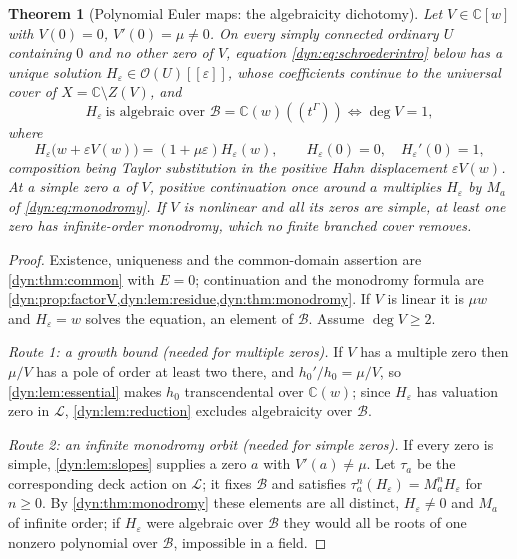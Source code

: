 \documentclass[11pt,letterpaper]{article}
\newtheorem{theorem}{Theorem}[section]
\theoremstyle{definition}
\theoremstyle{remark}
\newcommand{\C}{\mathbb C}
\newcommand{\OO}{\mathcal O}
\newcommand{\BB}{\mathscr B}
\newcommand{\LL}{\mathscr L}
\newcommand{\eps}{\varepsilon}
\numberwithin{equation}{section}
\begin{document}
\begin{theorem}[Polynomial Euler maps: the algebraicity dichotomy]
\label{dyn:thm:dichotomy}
Let $V\in\C[w]$ with $V(0)=0$, $V'(0)=\mu\ne0$. On every simply connected
ordinary $U$ containing $0$ and no other zero of $V$, equation
\eqref{dyn:eq:schroederintro} below has a unique solution
$H_\eps\in\OO(U)[[\eps]]$, whose coefficients continue to the universal
cover of $X=\C\setminus Z(V)$, and
\begin{equation}\label{dyn:eq:dichotomy}
 H_\eps\ \text{is algebraic over }\BB=\C(w)((t^{\Gamma}))
 \iff \deg V=1 ,
\end{equation}
where
\begin{equation}\label{dyn:eq:schroederintro}
 H_\eps\bigl(w+\eps V(w)\bigr)=(1+\mu\eps)H_\eps(w),
 \qquad H_\eps(0)=0,\quad H_\eps'(0)=1,
\end{equation}
composition being Taylor substitution in the positive Hahn displacement
$\eps V(w)$. At a simple zero $a$ of $V$, positive continuation once around
$a$ multiplies $H_\eps$ by $M_a$ of \eqref{dyn:eq:monodromy}. If $V$ is
nonlinear and all its zeros are simple, at least one zero has
infinite-order monodromy, which no finite branched cover removes.
\end{theorem}
\begin{proof}
Existence, uniqueness and the common-domain assertion are
\cref{dyn:thm:common} with $E=0$; continuation and the monodromy formula
are \cref{dyn:prop:factorV,dyn:lem:residue,dyn:thm:monodromy}. If $V$ is
linear it is $\mu w$ and $H_\eps=w$ solves the equation, an element of
$\BB$. Assume $\deg V\ge2$.

\emph{Route 1: a growth bound (needed for multiple zeros).} If $V$ has a
multiple zero then $\mu/V$ has a pole of order at least two there, and
$h_0'/h_0=\mu/V$, so \cref{dyn:lem:essential} makes $h_0$ transcendental
over $\C(w)$; since $H_\eps$ has valuation zero in $\LL$,
\cref{dyn:lem:reduction} excludes algebraicity over $\BB$.

\emph{Route 2: an infinite monodromy orbit (needed for simple zeros).} If
every zero is simple, \cref{dyn:lem:slopes} supplies a zero $a$ with
$V'(a)\ne\mu$. Let $\tau_a$ be the corresponding deck action on $\LL$; it
fixes $\BB$ and satisfies $\tau_a^{n}(H_\eps)=M_a^{n}H_\eps$ for $n\ge0$.
By \cref{dyn:thm:monodromy} these elements are all distinct, $H_\eps\ne0$
and $M_a$ of infinite order; if $H_\eps$ were algebraic over $\BB$ they
would all be roots of one nonzero polynomial over $\BB$, impossible in a
field.
\end{proof}
\end{document}
